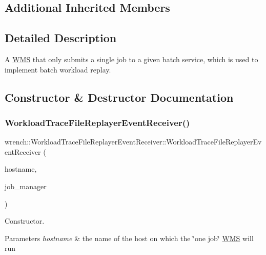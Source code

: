 \subsection*{Additional Inherited Members}


\subsection{Detailed Description}
A \hyperlink{classwrench_1_1_w_m_s}{W\+MS} that only submits a single job to a given batch service, which is used to implement batch workload replay. 

\subsection{Constructor \& Destructor Documentation}
\mbox{\label{classwrench_1_1_workload_trace_file_replayer_event_receiver_abc417862cd19293eb3a44ebbed985b9d}} 
\subsubsection{\texorpdfstring{Workload\+Trace\+File\+Replayer\+Event\+Receiver()}{WorkloadTraceFileReplayerEventReceiver()}}
{\footnotesize\ttfamily wrench\+::\+Workload\+Trace\+File\+Replayer\+Event\+Receiver\+::\+Workload\+Trace\+File\+Replayer\+Event\+Receiver (\begin{DoxyParamCaption}\item[{std\+::string}]{hostname,  }\item[{std\+::shared\+\_\+ptr$<$ \hyperlink{classwrench_1_1_job_manager}{Job\+Manager} $>$}]{job\+\_\+manager }\end{DoxyParamCaption})\hspace{0.3cm}{\ttfamily [inline]}}



Constructor. 


\begin{DoxyParams}{Parameters}
{\em hostname} & the name of the host on which the \char`\"{}one job\char`\"{} \hyperlink{classwrench_1_1_w_m_s}{W\+MS} will run \\
\hline
\end{DoxyParams}


